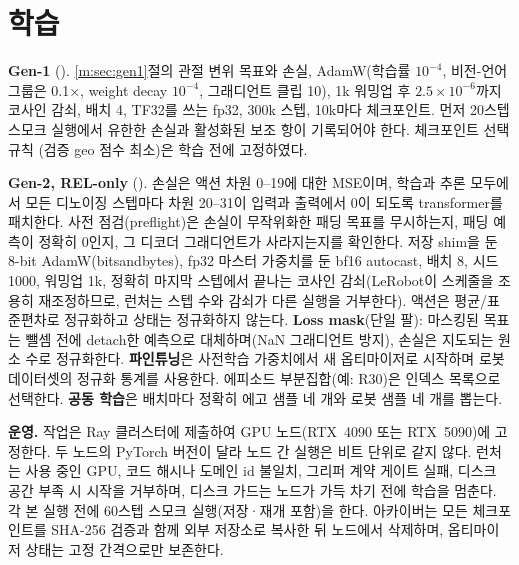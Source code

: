 \documentclass[conference,10pt]{IEEEtran}
\begin{document}
\section{학습}\label{m:sec:train}
\textbf{Gen-1} (). \ref{m:sec:gen1}절의 관절 변위 목표와 손실, AdamW(학습률 $10^{-4}$, 비전-언어 그룹은
0.1$\times$, weight decay $10^{-4}$, 그래디언트 클립 10), 1k 워밍업 후 $2.5\times10^{-6}$까지 코사인 감쇠, 배치 4, TF32를 쓰는 fp32,
300k 스텝, 10k마다 체크포인트. 먼저 20스텝 스모크 실행에서 유한한 손실과 활성화된 보조 항이 기록되어야 한다. 체크포인트 선택 규칙
(검증 geo 점수 최소)은 학습 전에 고정하였다.

\textbf{Gen-2, REL-only} (). 손실은 액션 차원 0--19에 대한 MSE이며, 학습과 추론 모두에서 모든 디노이징
스텝마다 차원 20--31이 입력과 출력에서 0이 되도록 transformer를 패치한다. 사전 점검(preflight)은 손실이 무작위화한 패딩 목표를
무시하는지, 패딩 예측이 정확히 0인지, 그 디코더 그래디언트가 사라지는지를 확인한다. 저장 shim을 둔 8-bit AdamW(bitsandbytes),
fp32 마스터 가중치를 둔 bf16 autocast, 배치 8, 시드 1000, 워밍업 1k, 정확히 마지막 스텝에서 끝나는 코사인 감쇠(LeRobot이 스케줄을
조용히 재조정하므로, 런처는 스텝 수와 감쇠가 다른 실행을 거부한다). 액션은 평균/표준편차로 정규화하고 상태는 정규화하지 않는다.
\textbf{Loss mask}(단일 팔): 마스킹된 목표는 뺄셈 전에 detach한 예측으로 대체하며(NaN 그래디언트 방지), 손실은 지도되는 원소 수로
정규화한다. \textbf{파인튜닝}은 사전학습 가중치에서 새 옵티마이저로 시작하며 로봇 데이터셋의 정규화 통계를 사용한다. 에피소드
부분집합(예: R30)은 인덱스 목록으로 선택한다. \textbf{공동 학습}은 배치마다 정확히 에고 샘플 네 개와 로봇 샘플 네 개를 뽑는다.

\textbf{운영.} 작업은 Ray 클러스터에 제출하여 GPU 노드(RTX~4090 또는 RTX~5090)에 고정한다. 두 노드의 PyTorch 버전이 달라 노드 간
실행은 비트 단위로 같지 않다. 런처는 사용 중인 GPU, 코드 해시나 도메인 id 불일치, 그리퍼 계약 게이트 실패, 디스크 공간 부족 시
시작을 거부하며, 디스크 가드는 노드가 가득 차기 전에 학습을 멈춘다. 각 본 실행 전에 60스텝 스모크 실행(저장·재개 포함)을 한다.
아카이버는 모든 체크포인트를 SHA-256 검증과 함께 외부 저장소로 복사한 뒤 노드에서 삭제하며, 옵티마이저 상태는 고정 간격으로만
보존한다.
\end{document}
